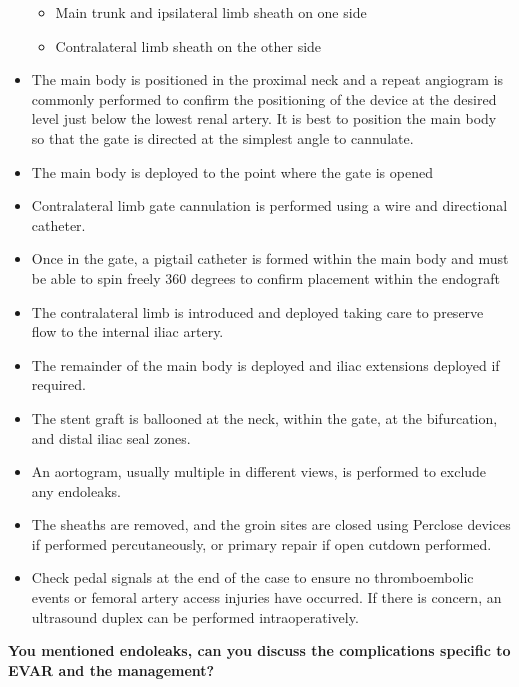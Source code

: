 \documentclass[
]{book}
\begin{document}
\begin{itemize}
  \begin{itemize}
  \item
    Main trunk and ipsilateral limb sheath on one side
  \item
    Contralateral limb sheath on the other side
  \end{itemize}
\item
  The main body is positioned in the proximal neck and a repeat
  angiogram is commonly performed to confirm the positioning of the
  device at the desired level just below the lowest renal artery. It
  is best to position the main body so that the gate is directed at
  the simplest angle to cannulate.
\item
  The main body is deployed to the point where the gate is opened
\item
  Contralateral limb gate cannulation is performed using a wire and
  directional catheter.
\item
  Once in the gate, a pigtail catheter is formed within the main body
  and must be able to spin freely 360 degrees to confirm placement
  within the endograft
\item
  The contralateral limb is introduced and deployed taking care to
  preserve flow to the internal iliac artery.
\item
  The remainder of the main body is deployed and iliac extensions
  deployed if required.
\item
  The stent graft is ballooned at the neck, within the gate, at the
  bifurcation, and distal iliac seal zones.
\item
  An aortogram, usually multiple in different views, is performed to
  exclude any endoleaks.
\item
  The sheaths are removed, and the groin sites are closed using
  Perclose devices if performed percutaneously, or primary repair if
  open cutdown performed.
\item
  Check pedal signals at the end of the case to ensure no
  thromboembolic events or femoral artery access injuries have
  occurred. If there is concern, an ultrasound duplex can be performed
  intraoperatively.
\end{itemize}

\textbf{You mentioned endoleaks, can you discuss the complications specific to
EVAR and the management?} \citep{mooreVascularEndovascularSurgery2019}
\end{document}
